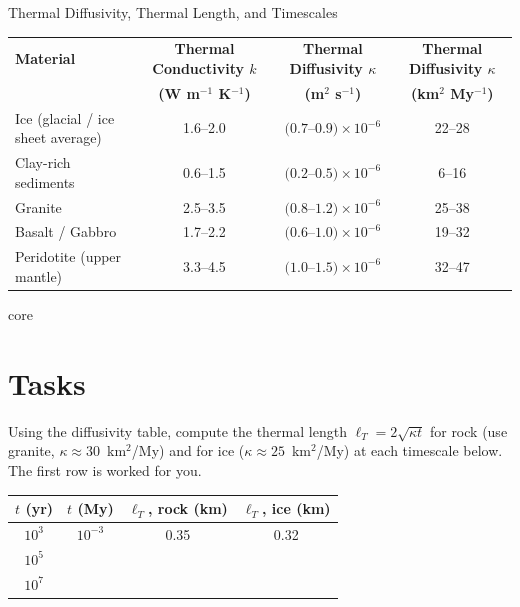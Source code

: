\begin{activity}{Thermal Diffusivity, Thermal Length, and Timescales}
{\begin{center}
    \label{tab:diffusivity}
    \begin{tabular}{lccc}
        \toprule
        \textbf{Material} &
        \textbf{Thermal Conductivity $k$} &
        \textbf{Thermal Diffusivity $\kappa$} &
        \textbf{Thermal Diffusivity $\kappa$} \\
        &
        \textbf{(W m$^{-1}$ K$^{-1}$)} &
        \textbf{(m$^2$ s$^{-1}$)} &
        \textbf{(km$^2$ My$^{-1}$)} \\
        \midrule
        Ice (glacial / ice sheet average) & 1.6--2.0 & $(0.7$--$0.9)\times10^{-6}$ & 22--28 \\
        Clay-rich sediments               & 0.6--1.5 & $(0.2$--$0.5)\times10^{-6}$ & 6--16  \\
        Granite                           & 2.5--3.5 & $(0.8$--$1.2)\times10^{-6}$ & 25--38 \\
        Basalt / Gabbro                   & 1.7--2.2 & $(0.6$--$1.0)\times10^{-6}$ & 19--32 \\
        Peridotite (upper mantle)         & 3.3--4.5 & $(1.0$--$1.5)\times10^{-6}$ & 32--47 \\
        \bottomrule
    \end{tabular}
\end{center}
}{core}

\section*{Tasks}
\begin{questions}


Using the diffusivity table, compute the thermal length $\ell_T=2\sqrt{\kappa t}$ for rock (use granite, $\kappa\approx30$~km$^2$/My) and for ice ($\kappa\approx25$~km$^2$/My) at each timescale below. The first row is worked for you.

\begin{center}
\begin{tabular}{cccc}
\toprule
$t$ (yr) & $t$ (My) & $\ell_T$, rock (km) & $\ell_T$, ice (km) \\
\midrule
$10^3$ & $10^{-3}$ & 0.35 & 0.32 \\
$10^5$ &           &      & \\
$10^7$ &           &      & \\
\bottomrule
\end{tabular}
\end{center}


\end{questions}
\end{activity}
